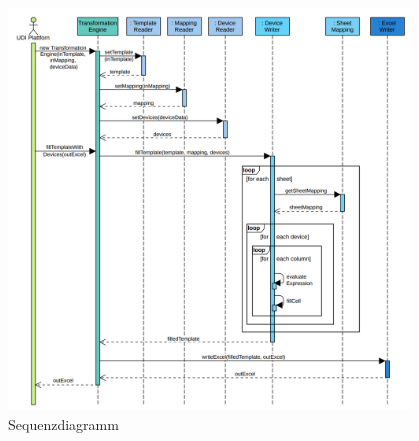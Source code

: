 \begin{figure}[h]
 \centering
 \includegraphics[width=0.95\textwidth]{Bilder/Sequenzdiagramm2}
 \caption[Sequenzdiagramm für Ansatz\nbs\ref{MD}]{Sequenzdiagramm}
 \label{fig:seq2}
\end{figure}

